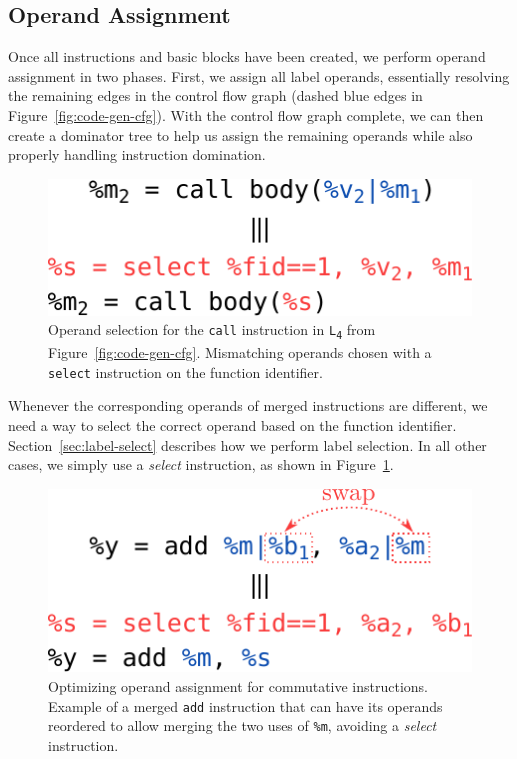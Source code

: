 \subsection{Operand Assignment} \label{sec:op-assign}

Once all instructions and basic blocks have been created, we perform operand
assignment in two phases.
First, we assign all label operands, essentially resolving the remaining edges
in the control flow graph (dashed blue edges in Figure~\ref{fig:code-gen-cfg}).
With the control flow graph complete, we can then create a dominator
tree to help us assign the remaining operands while also properly
handling instruction domination.

\begin{figure}[t]
  \centering
  \includegraphics[scale=0.7]{src/merge-operation/figs/operand-select.pdf}
  \caption{Operand selection for the \texttt{call} instruction in \texttt{L\textsubscript{4}}
             from Figure~\ref{fig:code-gen-cfg}. Mismatching operands chosen
             with a \texttt{select} instruction on the function identifier.}
  \label{fig:operand-select}
\end{figure}

Whenever the corresponding operands of merged instructions are different, we
need a way to select the correct operand based on the function identifier.
Section~\ref{sec:label-select} describes how we perform label selection.
In all other cases, we simply use a \textit{select} instruction, as shown in
Figure~\ref{fig:operand-select}.

\begin{figure}[t]
  \centering
  \includegraphics[scale=0.7]{src/merge-operation/figs/operand-select-reorder.pdf}
    \caption{Optimizing operand assignment for commutative instructions.
             Example of a merged \texttt{add} instruction that can have its
             operands reordered to allow merging the two uses of \texttt{\%m},
             avoiding a \textit{select} instruction.}
  \label{fig:operand-select-reorder}
\end{figure}

